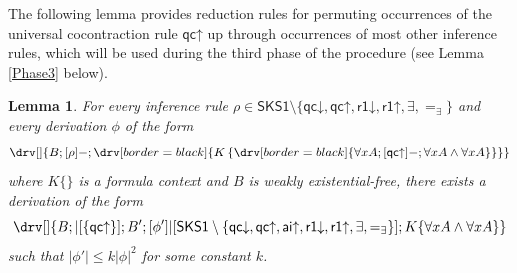 \documentclass[10pt]{article}
\newtheorem{lemma}[theorem]{Lemma}
\theoremstyle{definition}\newtheorem{remark}[theorem]{Remark}
\theoremstyle{definition}\newtheorem{example}[theorem]{Example}
\theoremstyle{definition}\newtheorem{definition}[theorem]{Definition}
\newcommand{\SKSqDecomp}{{\mathsf{SKS1}}}
\newcommand{\aiUp}{{\mathsf{ai\mathord\uparrow}}}
\newcommand{\qcUp}{{\mathsf{qc\mathord\uparrow}}}
\newcommand{\qcDown}{{\mathsf{qc\mathord\downarrow}}}
\newcommand{\rOneUp}{{\mathsf{r1\mathord\uparrow}}}
\newcommand{\rOneDown}{{\mathsf{r1\mathord\downarrow}}}
\newcommand{\eqExists}{=_{\exists}}
\begin{document}
	The following lemma provides reduction rules for permuting occurrences of the universal cocontraction rule $\qcUp$ up through occurrences of most other inference rules, which will be used during the third phase of the procedure (see Lemma \ref{Phase3} below).
	
	\begin{lemma}\label{Phase3Permutations}
		For every inference rule $\rho \in \SKSqDecomp \setminus \{\qcDown, \qcUp, \rOneDown, \rOneUp, \exists, \eqExists\}$ and every derivation $\phi$ of the form
		\[
		\drv[] {
			B ; [\rho]- ; \drv[border=black] {
				K \left\{ \drv[border=black] {
					\forall x A ; [\qcUp]- ; \forall x A \land \forall x A
				} \right\}
			}
		} 
		\]
		where $K \{\}$ is a formula context and $B$ is weakly existential-free, there exists a derivation of the form
		\[
		\drv[] {
			B ; |[\{\qcUp\}] ; B' ; [\phi']|[\SKSqDecomp \setminus \{\qcDown, \qcUp, \aiUp, \rOneDown, \rOneUp, \exists, \eqExists\}] ; K \{\forall x A \land \forall x A\}
		}
		\]
		such that $| \phi' | \leq k | \phi |^2$ for some constant $k$.
	\end{lemma}
	
\end{document}
